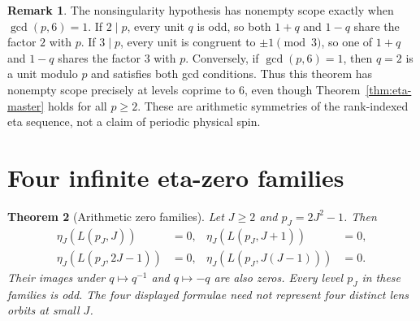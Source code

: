 \documentclass[11pt]{article}
\newtheorem{theorem}{Theorem}[section]
\theoremstyle{definition}
\newtheorem{remark}[theorem]{Remark}
\begin{document}
\begin{remark}
The nonsingularity hypothesis has nonempty scope exactly when
$\gcd(p,6)=1$.  If $2\mid p$, every unit $q$ is odd, so both $1+q$ and
$1-q$ share the factor $2$ with $p$.  If $3\mid p$, every unit is congruent
to $\pm1\pmod 3$, so one of $1+q$ and $1-q$ shares the factor $3$ with $p$.
Conversely, if $\gcd(p,6)=1$, then $q=2$ is a unit modulo $p$ and satisfies
both gcd conditions.  Thus this theorem has nonempty scope precisely at
levels coprime to $6$, even though Theorem~\ref{thm:eta-master} holds for all
$p\geq2$.  These are arithmetic symmetries of the rank-indexed eta sequence,
not a claim of periodic physical spin.
\end{remark}

\section{Four infinite eta-zero families}
\label{sec:zeros}

\begin{theorem}[Arithmetic zero families]
\label{thm:zero-families}
Let $J\geq2$ and $p_J=2J^2-1$.  Then
\begin{align}
 \eta_J(L(p_J,J))&=0, &
 \eta_J(L(p_J,J+1))&=0,\nonumber\\
 \eta_J(L(p_J,2J-1))&=0, &
 \eta_J(L(p_J,J(J-1)))&=0.
 \label{eq:four-zero-families}
\end{align}
Their images under $q\mapsto q^{-1}$ and $q\mapsto-q$ are also zeros.
Every level $p_J$ in these families is odd.
The four displayed formulae need not represent four distinct lens orbits at
small $J$.
\end{theorem}
\end{document}
